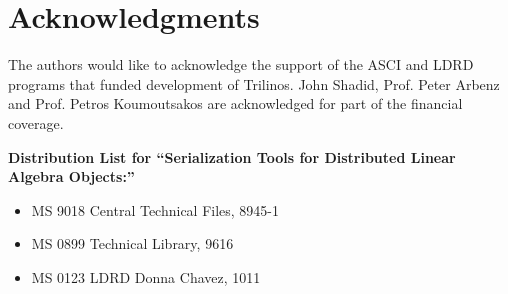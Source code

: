 \documentclass[11pt,relax]{SANDreport}
\begin{document}
\section*{Acknowledgments}

The authors would like to acknowledge the support of the ASCI and LDRD programs
that funded development of Trilinos. John Shadid, Prof. Peter Arbenz and Prof.
Petros Koumoutsakos are acknowledged for part of the financial coverage.

\medskip




\newpage

\noindent
{\bf
Distribution List for ``Serialization Tools for Distributed Linear Algebra Objects:''
}

\begin{itemize}
\item MS 9018 Central Technical Files, 8945-1
\item MS 0899 Technical Library, 9616
\item MS 0123 LDRD Donna Chavez, 1011
\end{itemize}
\end{document}
